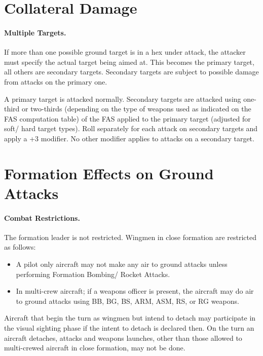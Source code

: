 \begin{advancedrules}

\section{Collateral Damage}
\label{rule:collateral-damage}

\paragraph{Multiple Targets.} If more than one possible ground target is in a hex under attack, the attacker must specify the actual target being aimed at. This becomes the primary target, all others are secondary targets. Secondary targets are subject to possible damage from attacks on the primary one.

A primary target is attacked normally. Secondary targets are attacked using one-third or two-thirds (depending on the type of weapons used as indicated on the FAS computation table) of the FAS applied to the primary target (adjusted for soft/ hard target types). Roll separately for each attack on secondary targets and apply a +3 modifier.  No other modifier applies to attacks on a secondary target.

\section{Formation Effects on Ground Attacks}

\paragraph{Combat Restrictions.} The formation leader is not restricted. Wingmen in close formation are restricted as follows:
\begin{itemize}
    \item A pilot only aircraft may not make any air to ground attacks unless performing Formation Bombing/ Rocket Attacks.
    \item In multi-crew aircraft; if a weapons officer is present, the aircraft may do air to ground attacks using BB, BG, BS, ARM, ASM, RS, or RG weapons.
\end{itemize}

Aircraft that begin the turn as wingmen but intend to detach may participate in the visual sighting phase if the intent to detach is declared then. On the turn an aircraft detaches, attacks and weapons launches, other than those allowed to multi-crewed aircraft in close formation, may not be done.


\end{advancedrules}
